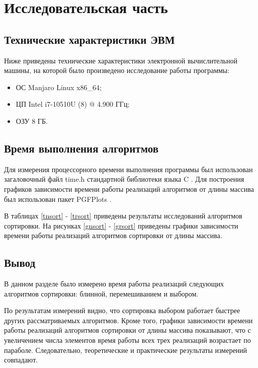 \chapter{Исследовательская часть}

\section{Технические характеристики ЭВМ}

Ниже приведены технические характеристики электронной вычислительной машины, на которой было произведено исследование работы программы:

\begin{itemize}
	\item ОС Manjaro Linux x86\_64;
	\item ЦП Intel i7-10510U (8) @ 4.900 ГГц;
	\item ОЗУ 8 ГБ.
\end{itemize}

\section{Время выполнения алгоритмов}

Для измерения процессорного времени выполнения программы был использован загаловочный файл time.h стандартной библиотеки языка C \cite{timeh}. Для построения графиков зависимости времени работы реализаций алгоритмов от длины массива был использован пакет PGFPlots \cite{pgfp}.

В таблицах \ref{tnsort} - \ref{trsort} приведены результаты исследований алгоритмов сортировки. На рисунках \ref{gnsort} - \ref{grsort} приведены графики зависимости времени работы реализаций алгоритмов сортировки от длины массива.

\section*{Вывод}

В данном разделе было измерено время работы реализаций следующих алгоритмов сортировки: блинной, перемешиванием и выбором.

По результатам измерений видно, что сортировка выбором работает быстрее других рассматриваемых алгоритмов. Кроме того, графики зависимости времени работы реализаций алгоритмов сортировки от длины массива показывают, что с увеличением числа элементов время работы всех трех реализаций возрастает по параболе. Следовательно, теоретические и практические результаты измерений совпадают.

